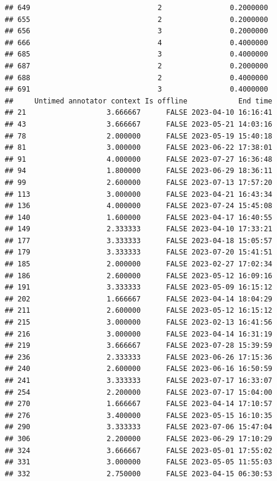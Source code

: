 \documentclass[
]{article}
\begin{document}
\begin{verbatim}
## 649                              2                0.2000000
## 655                              2                0.2000000
## 656                              3                0.2000000
## 666                              4                0.4000000
## 685                              3                0.4000000
## 687                              2                0.2000000
## 688                              2                0.4000000
## 691                              3                0.4000000
##     Untimed annotator context Is offline            End time
## 21                   3.666667      FALSE 2023-04-10 16:16:41
## 43                   3.666667      FALSE 2023-05-21 14:03:16
## 78                   2.000000      FALSE 2023-05-19 15:40:18
## 81                   3.000000      FALSE 2023-06-22 17:38:01
## 91                   4.000000      FALSE 2023-07-27 16:36:48
## 94                   1.800000      FALSE 2023-06-29 18:36:11
## 99                   2.600000      FALSE 2023-07-13 17:57:20
## 113                  3.000000      FALSE 2023-04-21 16:43:34
## 136                  4.000000      FALSE 2023-07-24 15:45:08
## 140                  1.600000      FALSE 2023-04-17 16:40:55
## 149                  2.333333      FALSE 2023-04-10 17:33:21
## 177                  3.333333      FALSE 2023-04-18 15:05:57
## 179                  3.333333      FALSE 2023-07-20 15:41:51
## 185                  2.000000      FALSE 2023-02-27 17:02:34
## 186                  2.600000      FALSE 2023-05-12 16:09:16
## 191                  3.333333      FALSE 2023-05-09 16:15:12
## 202                  1.666667      FALSE 2023-04-14 18:04:29
## 211                  2.600000      FALSE 2023-05-12 16:15:12
## 215                  3.000000      FALSE 2023-02-13 16:41:56
## 216                  3.000000      FALSE 2023-04-14 16:31:19
## 219                  3.666667      FALSE 2023-07-28 15:39:59
## 236                  2.333333      FALSE 2023-06-26 17:15:36
## 240                  2.600000      FALSE 2023-06-16 16:50:59
## 241                  3.333333      FALSE 2023-07-17 16:33:07
## 254                  2.200000      FALSE 2023-07-17 15:04:00
## 270                  1.666667      FALSE 2023-04-14 17:10:57
## 276                  3.400000      FALSE 2023-05-15 16:10:35
## 290                  3.333333      FALSE 2023-07-06 15:47:04
## 306                  2.200000      FALSE 2023-06-29 17:10:29
## 324                  3.666667      FALSE 2023-05-01 17:55:02
## 331                  3.000000      FALSE 2023-05-05 11:55:03
## 332                  2.750000      FALSE 2023-04-15 06:30:53

\end{verbatim}
\end{document}
